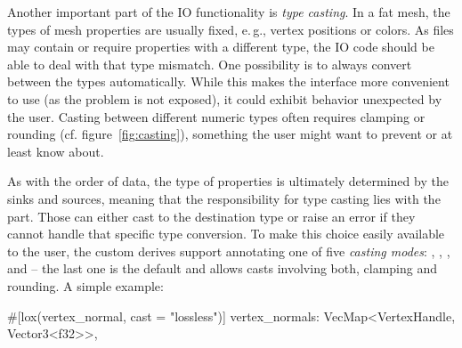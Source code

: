Another important part of the IO functionality is \emph{type casting}.
In a fat mesh, the types of mesh properties are usually fixed, e.\,g.,  vertex positions or \code{[u8; 3]} colors.
As files may contain or require properties with a different type, the IO code should be able to deal with that type mismatch.
One possibility is to always convert between the types automatically.
While this makes the interface more convenient to use (as the problem is not exposed), it could exhibit behavior unexpected by the user.
Casting between different numeric types often requires clamping or rounding (cf. figure~\ref{fig:casting}), something the user might want to prevent or at least know about.

As with the order of data, the type of properties is ultimately determined by the  sinks and sources, meaning that the responsibility for type casting lies with the  part.
Those can either cast to the destination type or raise an error if they cannot handle that specific type conversion.
To make this choice easily available to the user, the custom derives support annotating one of five \emph{casting modes}: , , ,  and  -- the last one is the default and allows casts involving both, clamping and rounding.
A simple example:

\begin{rustcode}
#[lox(vertex_normal, cast = "lossless")]
vertex_normals: VecMap<VertexHandle, Vector3<f32>>,
\end{rustcode}

\newpage

